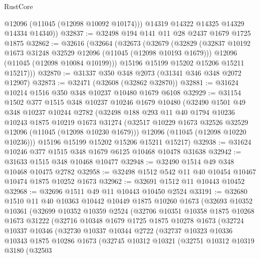 \begin{lexlean}{RustCore}
\begin{coremodule}
          @12096
          (@11045 (@12098 @10092 @10174)))
        @14319
        @14322
        @14325
        @14329
        @14334
        @14340))
@32837 := @32498 @194 @141 @11 @28 @2437 @1679 @1725 @1875
@32862 := @32616
    (@32664
      (@32673
        (@32679
          (@32829
            (@32837 @10192 @1673 @31248 @32529 @12096 (@11045 (@12098 @10193 @1679)))
            @12096
            (@11045 (@12098 @10084 @10199)))
          @15196
          @15199
          @15202
          @15206
          @15211
          @15217)))
@32870 := @31337 @350 @348 @2073 (@31341 @346 @348 @2072 @12907)
@32873 := @32471 (@32608 (@32862 @32870))
@32881 := @31624 @10214 @1516 @350 @348 @10237 @10480 @1679 @6108
@32929 := @31154
    @1502
    @377
    @1515
    @348
    @10237
    @10246
    @1679
    @10480
    (@32490
      @1501
      @49
      @348
      @10237
      @10244
      @2782
      (@32498
        @188
        @293
        @11
        @40
        @1794
        @10236
        @10243
        @1875
        @10219
        @1673
        @31274
        (@32517 @10229 @1673 @32526 @32529 @12096 (@11045 (@12098 @10230 @1679)))
        @12096
        (@11045 (@12098 @10220 @10236)))
      @15196
      @15199
      @15202
      @15206
      @15211
      @15217)
@32938 := @31624 @10246 @377 @1515 @348 @1679 @6125 @10468 @10478 @31638
@32942 := @31633 @1515 @348 @10468 @10477
@32948 := @32490 @1514 @49 @348 @10468 @10475 @2782
@32958 := @32498 @1512 @542 @11 @40 @10454 @10467 @10474 @1875 @10252 @1673
@32962 := @32691 @1512 @11 @10443 @10452
@32968 := @32696 @1511 @49 @11 @10443 @10450 @2524
@33191 := @32680
    @1510
    @11
    @40
    @10363
    @10442
    @10449
    @1875
    @10260
    @1673
    (@32693
      @10352
      @10361
      (@32699
        @10352
        @10359
        @2524
        (@32706
          @10351
          @10358
          @1875
          @10268
          @1673
          @31222
          (@32716
            @10348
            @1679
            @1725
            @1875
            @10278
            @1673
            (@32724
              @10337
              @10346
              (@32730
                @10337
                @10344
                @2722
                (@32737
                  @10323
                  @10336
                  @10343
                  @1875
                  @10286
                  @1673
                  (@32745
                    @10312
                    @10321
                    (@32751
                      @10312
                      @10319
                      @3180
                      (@32503

\end{coremodule}
\end{lexlean}
